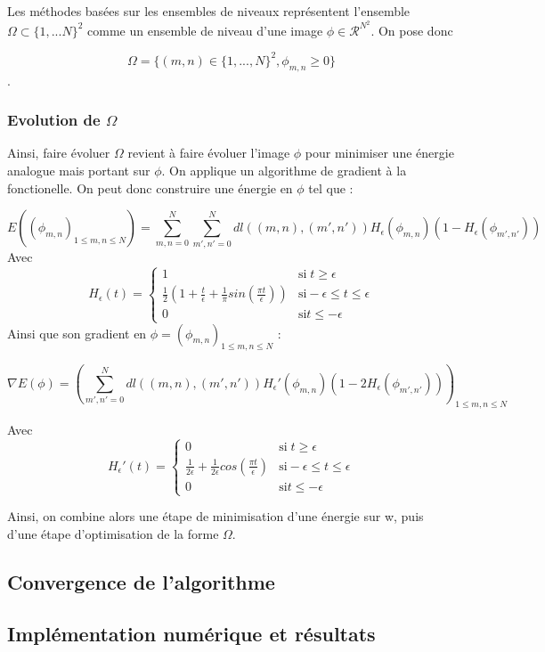 Les méthodes basées sur les ensembles de niveaux représentent l'ensemble $\Omega \subset \{1,...N\}^2$ comme un ensemble de niveau d'une image $\phi \in \mathcal{R}^{N^2}$. On pose donc 

\[ \Omega = \{ (m,n) \in \{1,...,N \}^2, \phi_{m,n} \geq 0 \} \].

\subsubsection{Evolution de \texorpdfstring{$\Omega$}{Lg}}

Ainsi, faire évoluer $\Omega$ revient à faire évoluer l'image $\phi$ pour minimiser une énergie analogue mais portant sur $\phi$. On applique un algorithme de gradient à la fonctionelle. On peut donc construire une énergie en $\phi$ tel que : 

\[ E ((\phi_{m,n})_{1 \leq m,n \leq N}) = \sum \limits_{m,n = 0}^N  \sum \limits_{m',n' = 0}^N  dl((m,n),(m',n')) H_{\epsilon} (\phi_{m,n}) ( 1 - H_{\epsilon}(\phi_{m',n'})) \] 
Avec 
\[ H_{\epsilon} (t) = \left\{ \begin{matrix}
1 & \text{si} \; t \geq \epsilon \\
\frac{1}{2} (1 + \frac{t}{\epsilon} + \frac{1}{\pi}sin(\frac{\pi t}{\epsilon})) & \text{si} -\epsilon \leq t \leq \epsilon \\
0 & \text{si} t \leq - \epsilon 
\end{matrix} \right. \] 
Ainsi que son gradient en $\phi = (\phi_{m,n})_{1 \leq m,n \leq N}$ : 

\[ \nabla E (\phi) = ( \sum \limits_{m',n' = 0}^N dl((m,n),(m',n')) H_{\epsilon}' (\phi_{m,n}) ( 1 - 2H_{\epsilon}(\phi_{m',n'})) ) _{1 \leq m,n \leq N}  \] 

Avec 
\[ H_{\epsilon}' (t) = \left\{ \begin{matrix}
0 & \text{si} \; t \geq \epsilon \\
\frac{1}{2 \epsilon} + \frac{1}{2 \epsilon} cos(\frac{\pi t}{\epsilon}) & \text{si} -\epsilon \leq t \leq \epsilon \\
0 & \text{si} t \leq - \epsilon 
\end{matrix} \right. \] 


Ainsi, on combine alors une étape de minimisation d'une énergie sur w, puis d'une étape d'optimisation de la forme $\Omega$. 
\subsection{Convergence de l'algorithme}
\subsection{Implémentation numérique et résultats}

